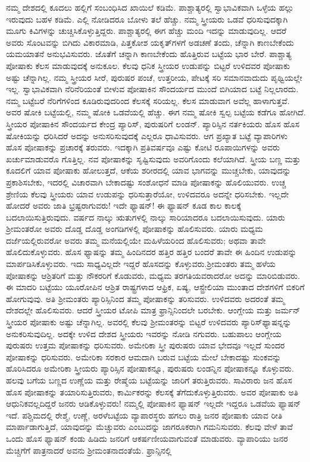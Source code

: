 ನಮ್ಮ ದೇಶದಲ್ಲಿ ಕೂದಲು ಹಲ್ಲಿಗೆ ಸಂಬಂಧಿಸಿದ ಖಾಯಿಲೆ ಕಡಿಮೆ. ಪಾಶ್ಚಾತ್ಯರಲ್ಲಿ ಸ್ವಾಭಾವಿಕವಾಗಿ ಒಳ್ಳೆಯ ಹಲ್ಲು ಇರುವುದು ಬಹಳ ಕಡಿಮೆ. ಎಲ್ಲಿ ನೋಡಿದರೂ ಬೋಳು ತಲೆ ಹೆಚ್ಚು. ನಮ್ಮ ಸ್ತ್ರೀಯರು ಒಡವೆ ಧರಿಸುವುದಕ್ಕಾಗಿ ಮೂಗು ಕಿವಿಗಳನ್ನು ಚುಚ್ಚಿಸಿಕೊಳ್ಳುತ್ತಿದ್ದರು. ಪಾಶ್ಚಾತ್ಯರಲ್ಲಿ ಈಗ ಹೆಚ್ಚು ಮಂದಿ ಇದನ್ನು ಮಾಡುವುದಿಲ್ಲ. ಆದರೆ ಅವರು ಸೊಂಟವನ್ನು ಬಿಗಿದು ವಿಕಾರಮಾಡಿ, ಪಿತ್ತಕೋಶ ಯಕೃತ್​ಗಳಗೆ ಅಡಚಣೆ ತಂದು, ಚೆನ್ನಾಗಿ ಕಾಣಬೇಕೆಂದು ಯಮಯಾತನೆ ಅನುಭವಿಸುವರು. ಜೊತೆಗೆ ಚನ್ನಾಗಿ ಕಾಣಬೇಕೆಂದು ಹೊತ್ತಿರುವ ಬಟ್ಟೆಯ ಭಾರ ಬೇರೆ. ಪಾಶ್ಚಾತ್ಯ ಪೋಷಾಕು ಕೆಲಸ ಮಾಡುವುದಕ್ಕೆ ಅನುಕೂಲ. ಕೆಲವು ಧನಿಕ ಸ್ತ್ರೀಯರ ಉಡುಪನ್ನು ಬಿಟ್ಟರೆ ಉಳಿದವರ ಪೋಷಾಕು ಅಷ್ಟು ಚೆನ್ನಾಗಿಲ್ಲ. ನಮ್ಮ ಸ್ತ್ರೀಯರ ಸೀರೆ, ಪುರುಷರ ಪಂಚೆ, ಉತ್ತರೀಯ, ಪೇಟಕ್ಕೆ ಸರಿ ಸಮಾನವಾದುದು ಪೃಥ್ವಿಯಲ್ಲೇ ಇಲ್ಲ. ಸ್ವಾಭಾವಿಕವಾಗಿ ನೆರಿನೆರಿಯಂತೆ ಬೀಳುವ ಪೋಷಾಕಿನ ಸೌಂದರ್ಯದ ಮುಂದೆ ಬಿಗಿಯಾದ ಬಟ್ಟೆ ನಿಲ್ಲಲಾರದು. ನಮ್ಮ ಬಟ್ಟೆಬರೆ ನೆರಿಗೆಗಳಿಂದ ಕೂಡಿರುವುದರಿಂದ ಕೆಲಸಕ್ಕೆ ಸರಿಯಲ್ಲ. ಕೆಲಸ ಮಾಡುವಾಗ ಅವೆಲ್ಲ ಹಾಳಾಗುತ್ತವೆ. ಅವರ ಷೋಕಿ ಬಟ್ಟೆಯಲ್ಲಿ, ನಮ್ಮ ಷೋಕಿ ಒಡವೆಯಲ್ಲಿ ಹೆಚ್ಚು. ಈಗ ನಮ್ಮ ಷೋಕಿ ಸ್ವಲ್ಪ ಬಟ್ಟೆಯ ಕಡೆಗೂ ಹೋಗಿದೆ. ಸ್ತ್ರೀಯರ ಪೋಷಾಕಿನ ಸೌಂದರ್ಯದ ಕೇಂದ್ರ ಪ್ಯಾರಿಸ್​, ಪುರುಷರಿಗೆ ಲಂಡನ್​. ಪ್ಯಾರಿಸ್ಸಿನ ನರ್ತಕಿಯರು ಹೊಸ ಹೊಸ ಷೋಕಿಯನ್ನು ಧರಿಸಿದರೆ ಅದನ್ನು ಅನುಸರಿಸುವುದಕ್ಕೆ ಎಲ್ಲರೂ ಧಾವಿಸುವರು. ಆಗ ಪ್ರಖ್ಯಾತ ಬಟ್ಟೆ ವ್ಯಾಪಾರಿಗಳು ಹೊಸ ಪೋಷಾಕನ್ನು ಪ್ರಚಾರಕ್ಕೆ ತರುವರು. ಇದಕ್ಕಾಗಿ ಪ್ರತಿವರ್ಷವೂ ಎಷ್ಟು ಕೋಟಿ ರೂಪಾಯಿಗಳನ್ನು ಅವರು ಖರ್ಚುಮಾಡುವರೊ ಗೊತ್ತಿಲ್ಲ. ನವ ಪೋಷಾಕನ್ನು ಸೃಷ್ಟಿಸುವುದು ಅವರಿಗೊಂದು ಕಲೆಯಾಗಿದೆ. ಸ್ತ್ರೀಯ ಬಣ್ಣ ಮತ್ತು ಕೂದಲಿಗೆ ಯಾವ ಪೋಷಾಕು ಹೋಲುತ್ತದೆ, ಆಕೆಯ ಶರೀರದಲ್ಲಿ ಯಾವ ಭಾಗವನ್ನು ಮುಚ್ಚಬೇಕು, ಯಾವುದನ್ನು ಪ್ರಕಾಶಿಸಬೇಕು, ಇದರಲ್ಲಿ ವಿಚಾರವಾಗಿ ಬೇಕಾದಷ್ಟು ಸಂಶೋಧನೆ ಮಾಡಿ ಪೋಷಾಕನ್ನು ಹೊಲಿಯುವರು. ಉಚ್ಚ ಶ್ರೇಣಿಯ ಕೆಲವು ಸ್ತ್ರೀಯರು ಯಾವ ಉಡುಪನ್ನು ಧರಿಸುತ್ತಾರೆಯೋ, ಉಳಿದವರೂ ಅದನ್ನೇ ಧರಿಸಬೇಕು. ಇಲ್ಲದೇ ಹೋದರೆ ಅವರು ಜಾತಿ ಭ್ರಷ್ಟರಾಗುವರು! ಇದೇ ಫ್ಯಾಷನ್​! ಈ ಫ್ಯಾಷನ್​ ಕೂಡ ಕಾಲ ಕಾಲಕ್ಕೆ ಬದಲಾಯಿಸುತ್ತಿರುವುದು. ವರ್ಷದ ನಾಲ್ಕು ಋತುಗಳಲ್ಲಿ ನಾಲ್ಕು ಸಾರಿಯಾದರೂ ಬದಲಾಯಿಸುವುದು. ಯಾರು ಶ‍್ರೀಮಂತರೋ ಅವರು ದೊಡ್ಡ ದೊಡ್ಡ ಅಂಗಡಿಗಳಲ್ಲಿ ಪೋಷಾಕನ್ನು ಹೊಲಿಸುವರು. ಯಾರು ಮಧ್ಯಮ ದರ್ಜೆಯಲ್ಲಿರುವರೋ ಅವರು ತಮ್ಮ ಮನೆಯಲ್ಲಿಯೇ ಮಹಿಳೆಯರಿಂದ ಹೊಲಿಸುವರು; ಅಥವಾ ತಾವೇ ಹೊಲಿದುಕೊಳ್ಳುವರು. ಹೊಸ ಫ್ಯಾಷನ್ನು ತಮ್ಮ ಹಿಂದಿನದರ ಹತ್ತಿರ ಹತ್ತಿರ ಬಂದರೆ ತಾವೇ ಈ ಹಿಂದಿನ ಉಡುಪನ್ನು ಮಾರ್ಪಡಿಸಿಕೊಳ್ಳುವರು. ಇದು ಸಾಧ್ಯವಿಲ್ಲದೇ ಇದ್ದರೆ ಹೊಸದನ್ನು ಕೊಳ್ಳುವರು.\break ಶ‍್ರೀಮಂತರು ತಮ್ಮ ಹಳೆಯ ಪೋಷಾಕನ್ನು ಆಶ್ರಿತರಿಗೆ ಮತ್ತು ನೌಕರರಿಗೆ ಕೊಡುವರು, ಮಧ್ಯಮ ತರಗತಿಯವರಾದರೋ ಅದನ್ನು ಮಾರಿಬಿಡುವರು. ಈ ಮಾದರಿ ಬಟ್ಟೆಯು ಯೂರೋಪಿನ ಆಶ್ರಿತ ರಾಷ್ಟ್ರಗಳಾದ ಆಫ್ರಿಕ, ಏಷ್ಯ, ಆಸ್ಟ್ರೇಲಿಯಾ ಮುಂತಾದ ದೇಶಗಳಿಗೆ ಬಿಕರಿಗೆ ಹೋಗುವುವು. ಅತಿ ಶ‍್ರೀಮಂತರು ಪ್ಯಾರಿಸ್ಸಿನಿಂದ ತಮ್ಮ ಪೋಷಾಕನ್ನು ತರಿಸುವರು. ಉಳಿದವರು ಅದರಂತೆ ತಮ್ಮ ದೇಶದಲ್ಲೇ ಹೊಲಿಸುವರು. ಆದರೆ ಸ್ತ್ರೀಯರ ಟೋಪಿ ಮಾತ್ರ ಫ್ರಾನ್ಸಿನಿಂದಲೇ ಬರಬೇಕು. ಆಂಗ್ಲೇಯ ಮತ್ತು ಜರ್ಮನ್​ ಸ್ತ್ರೀಯರ ಪೋಷಾಕು ಅಷ್ಟು ಚೆನ್ನಾಗಿಲ್ಲ. ಅವರಲ್ಲಿ ಕೆಲವು ಶ‍್ರೀಮಂತರನ್ನು ಬಿಟ್ಟರೆ ಉಳಿದವರು ಪ್ಯಾರಿಸ್​ ಫ್ಯಾಷನ್ನನ್ನು ಅನುಕರಿಸುವುದಿಲ್ಲ. ಅದಕ್ಕೇ ಉಳಿದ ದೇಶದ ಸ್ತ್ರೀಯರು ಇವರನ್ನು ನೋಡಿ ನಗುವರು. ಬಹುಪಾಲು ಆಂಗ್ಲೇಯ ಪುರುಷರು ಉತ್ತಮ ಪೋಷಾಕನ್ನು ಧರಿಸುವರು. ಅಮೇರಿಕಾ ಸ್ತ್ರೀ ಪುರುಷರು ಯಾವ ಭೇದವೂ ಇಲ್ಲದೆ ಸುಂದರ ಪೋಷಾಕನ್ನು ಧರಿಸುವರು. ಅಮೇರಿಕಾ ಸರಕಾರ ಆಮದಾಗಿ ಬರುವ ಬಟ್ಟೆಯ ಮೇಲೆ ಬೇಕಾದಷ್ಟು ಸುಂಕವನ್ನು ಹೊರಿಸಿದರೂ ಅಮೇರಿಕಾ ಸ್ತ್ರೀಯರು ಪ್ಯಾರಿಸ್ಸಿನ ಪೋಷಾಕನ್ನೂ, ಪುರುಷರು ಲಂಡನ್ನಿನ ಪೋಷಾಕನ್ನೂ ಕೊಳ್ಳುವರು. ಹಲವು ಬಗೆಯ ಬಣ್ಣದ ಉಣ್ಣೆಯ ಮತ್ತು ರೇಷ್ಮೆಯ ಬಟ್ಟೆಯನ್ನು ಜಾರಿಗೆ ತರುತ್ತಿರುವರು. ಸಾವಿರಾರು ಜನ ಹೊಸ ಹೊಸ ಪೋಷಾಕನ್ನು ತಯಾರಿಸುತ್ತಿರುವರು, ಕಾರ್ಮಿಕರನ್ನು ಕೆಲಸಕ್ಕೆ ತೆಗೆದುಕೊಳ್ಳುತ್ತಿರುವರು. ಅವರ ಪೋಷಾಕು ಅತಿ ಆಧುನಿಕವಲ್ಲದಿದ್ದರೆ ಜನರು ಆಡಿಕೊಳ್ಳುವರು! ನಮ್ಮಲ್ಲಿ ಪೋಷಾಕಿನ ಫ್ಯಾಷನ್​ ಇಲ್ಲದೇ ಇದ್ದರೂ ಒಡವೆಯ ಫ್ಯಾಷನ್​ ಇದೆ. ಪಶ್ಚಿಮದಲ್ಲಿ ರೇಶ್ಮೆ, ಉಣ್ಣೆ, ಅರಳೆಬಟ್ಟೆಯ ವ್ಯಾಪಾರಸ್ಥರು ಹಗಲು ರಾತ್ರಿ ಜನರ ಪೋಷಾಕು ಯಾವ ರೀತಿ ಮಾರ್ಪಾ\break ಡಾಗುತ್ತಿದೆ, ಯಾವುದನ್ನು ಮೆಚ್ಚುವರು ಎಂಬುದನ್ನು ಜಾಗರೂಕರಾಗಿ ಗಮನಿಸುವರು. ಕೆಲವು ವೇಳೆ ತಾವೆ ಒಂದು ಹೊಸ ಫ್ಯಾಷನ್​ ಕಂಡು ಹಿಡಿದು ಜನರಿಗೆ ಆಕರ್ಷಣೀಯವಾಗುವಂತೆ ಮಾಡುವರು. ವ್ಯಾಪಾರಿಯು ಜನರ ಮೆಚ್ಚಿಗೆಗೆ ಪಾತ್ರನಾದರೆ ಅವನು ಶ‍್ರೀಮಂತನಾದಂತೆಯೆ. ಫ್ರಾನ್ಸಿನಲ್ಲಿ 